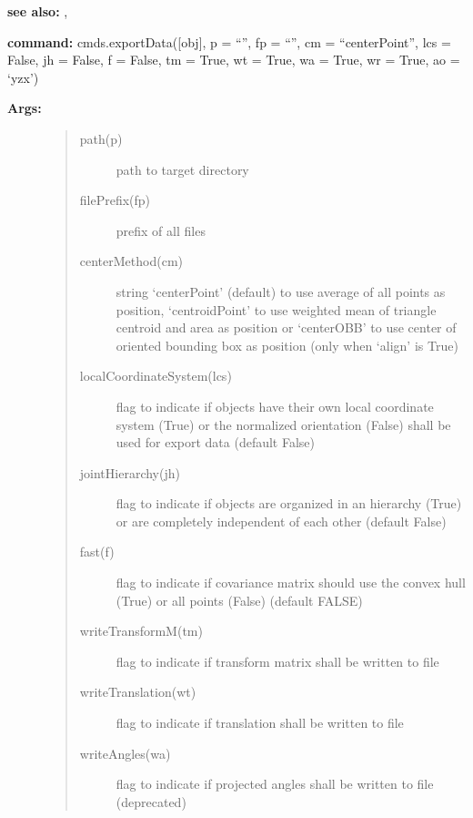 \documentclass[letterpaper,10pt,english]{sphinxmanual}
\begin{document}
\textbf{see also:} {\hyperref[pk_src.normalize:normalize]{}}, {\hyperref[pk_src.coordinateSystem:coordinatesystem]{}}

\textbf{command:} cmds.exportData({[}obj{]}, p = ``'', fp = ``'', cm = ``centerPoint'', lcs = False, jh = False, f = False, tm = True, wt = True, wa = True, wr = True, ao = `yzx')
\begin{description}
\item[{\textbf{Args:}}] \leavevmode\begin{quote}\begin{description}
\item[{path(p)}] \leavevmode
path to target directory

\item[{filePrefix(fp)}] \leavevmode
prefix of all files

\item[{centerMethod(cm)}] \leavevmode
string `centerPoint' (default) to use average of all points as position, `centroidPoint' to use weighted mean of triangle centroid and area as position or `centerOBB' to use center of oriented bounding box as position (only when `align' is True)

\item[{localCoordinateSystem(lcs)}] \leavevmode
flag to indicate if objects have their own local coordinate system (True) or the normalized orientation (False) shall be used for export data (default False)

\item[{jointHierarchy(jh)}] \leavevmode
flag to indicate if objects are organized in an hierarchy (True) or are completely independent of each other (default False)

\item[{fast(f)}] \leavevmode
flag to indicate if covariance matrix should use the convex hull (True) or all points (False) (default FALSE)

\item[{writeTransformM(tm)}] \leavevmode
flag to indicate if transform matrix shall be written to file

\item[{writeTranslation(wt)}] \leavevmode
flag to indicate if translation shall be written to file

\item[{writeAngles(wa)}] \leavevmode
flag to indicate if projected angles shall be written to file (deprecated)


\end{description}
\end{quote}
\end{description}
\end{document}
